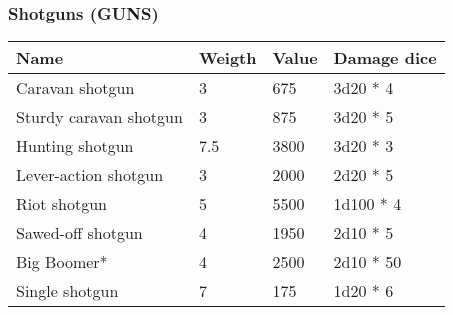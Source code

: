 
\subsubsection{Shotguns (GUNS)}
\begin{longtable}{|p{4cm}|p{1.5cm}|p{1.5cm}|p{9cm}|}
\hline
\bfseries Name & \bfseries Weigth & \bfseries Value & \bfseries Damage dice \\
\hline
Caravan shotgun  & 3 & 675 & 3d20 *  4 \\
Sturdy caravan shotgun  & 3 & 875 & 3d20 *  5 \\
Hunting shotgun  & 7.5  & 3800 & 3d20 *  3 \\
Lever-action shotgun  & 3 & 2000 & 2d20 *  5 \\
Riot shotgun  & 5 & 5500 & 1d100 *  4 \\
Sawed-off shotgun & 4 & 1950 & 2d10 *  5 \\
Big Boomer*  & 4 & 2500 & 2d10 *  50 \\
Single shotgun  & 7 & 175 & 1d20 *  6 \\
\hline
\end{longtable}
